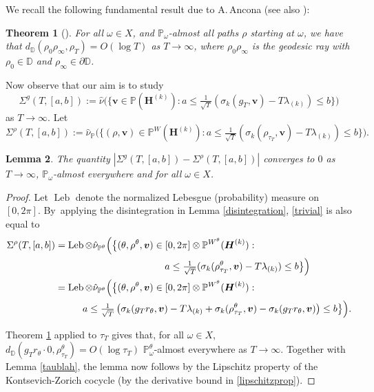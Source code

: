 \documentclass[10pt]{amsart}
\DeclareMathOperator{\Leb}{Leb}
\theoremstyle{plain}
\newtheorem{thm}{Theorem}[section]
\newtheorem{lemma}[thm]{Lemma}
\theoremstyle{definition}
\numberwithin{equation}{subsection}
\newcommand\bD{\mathbb{D}}
\newcommand\bP{\mathbb{P}}
\newcommand{\bfH}{\boldsymbol{H}}
\newcommand{\bfv}{\boldsymbol{v}}
\newcommand{\defeq}{:=}
\begin{document}
We recall the following fundamental result due to A.\,Ancona \cite{Anc90} (see also \cite[Lem.\,4.1]{Gru98}):

\begin{thm}[{\cite[Th.\,7.3]{Anc90}}]\label{Ancona}
For all $\omega \in X$, and $\bP_\omega$-almost all paths $\rho$ starting at $\omega$, we have that $d_{\bD}(\rho_{0}\rho_{\infty}, \rho_{T}) = O(\log T)$ as $T\to\infty$, where $\rho_{0}\rho_{\infty}$ is the geodesic ray with $\rho_{0}\in \bD$ and $\rho_{\infty} \in \partial \bD$.
\end{thm}

Now observe that our aim is to study
\[
\Sigma^{g}(T,[a,b]) \defeq \hat{\nu}\bigl(\bigl\{\bfv \in \bP(\bfH^{(k)}) :a \leq \tfrac{1}{\sqrt{T}} (\sigma_k(g_{T}, \bfv)- T\lambda_{(k)}) \leq b \bigr\} \bigr)
\]
as $T\to\infty$. Let
\begin{equation}\label{trivial}
\Sigma^{\rho}(T,[a,b]) \defeq \hat{\nu}_{\bP} \bigl(\bigl\{(\rho,\bfv) \in \bP^W(\bfH^{(k)}) :a \leq \tfrac{1}{\sqrt{T}} (\sigma_k(\rho_{\tau_{T}}, \bfv)- T\lambda_{(k)}) \leq b \bigr\} \bigr).
\end{equation}

\begin{lemma}\label{Ancona2}
The quantity
$|\Sigma^{g}(T,[a,b])-\Sigma^{\rho}(T,[a,b])|$ converges to $0$ as $T\to\infty$, $\bP_\omega$-almost everywhere and for all $\omega \in X$.
\end{lemma}
\begin{proof}
Let $\Leb$ denote the normalized Lebesgue (probability) measure on $[0, 2\pi]$. By~applying the disintegration in Lemma \ref{disintegration}, \eqref{trivial} is also equal to
\begin{align*}
\Sigma^{\rho}(T,[a,b]) &= \Leb \otimes \hat{\nu}_{\bP^\theta} \Bigl(\bigl\{(\theta,\rho^\theta,\bfv) \in [0,2\pi]\otimes \bP^{W^\theta}(\bfH^{(k)}) :\\
&\hspace*{4cm} a \leq \tfrac{1}{\sqrt{T}} (\sigma_k(\rho^\theta_{\tau_{T}}, \bfv)- T\lambda_{(k)}) \leq b \bigr\} \Bigr) \\
&= \Leb \otimes \hat{\nu}_{\bP^\theta} \Bigl(\bigl\{(\theta,\rho^\theta,\bfv) \in [0,2\pi]\otimes \bP^{W^\theta}(\bfH^{(k)}) :
\\
& \hspace*{1cm} a \leq \tfrac{1}{\sqrt{T}} \left(\sigma_k(g_T r_\theta, \bfv)- T\lambda_{(k)} +\sigma_k(\rho^\theta_{\tau_{T}}, \bfv)-\sigma_k(g_T r_\theta, \bfv)\right)\leq b \bigr\} \Bigr).
\end{align*}

Theorem \ref{Ancona} applied to $\tau_T$ gives that, for all $\omega \in X$, $d_{\bD}(g_T r_\theta \cdot 0, \rho^\theta_{\tau_T}) = O(\log \tau_T)$ $\bP^\theta_\omega$-almost everywhere as $T\to\infty$. Together with Lemma \ref{taublah}, the lemma now follows by the Lipschitz property of the Kontsevich-Zorich cocycle (by the derivative bound in \eqref{lipschitzprop}).
\end{proof}
\end{document}
